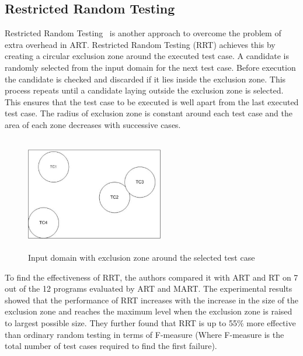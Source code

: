{\subsection{Restricted Random Testing}
Restricted Random Testing~\cite{chan2003normalized} is another approach to overcome the problem of extra overhead in ART. Restricted Random Testing (RRT) achieves this by creating a circular exclusion zone around the executed test case. A candidate is randomly selected from the input domain for the next test case. Before execution the candidate is checked and discarded if it lies inside the exclusion zone. This process repeats until a candidate laying outside the exclusion zone is selected. This ensures that the test case to be executed is well apart from the last executed test case. The radius of exclusion zone is constant around each test case and the area of each zone decreases with successive cases.

\begin{figure}[h]
	\centering
	\includegraphics[width= 6cm, height = 5cm]{Literature/RRT.pdf}
	\caption{Input domain with exclusion zone around the selected test case}
\end{figure}

To find the effectiveness of RRT, the authors compared it with ART and RT on 7 out of the 12 programs evaluated by ART and MART. The experimental results showed that the performance of RRT increases with the increase in the size of the exclusion zone and reaches the maximum level when the exclusion zone is raised to largest possible size. %
They further found that RRT is up to 55\% more effective than ordinary random testing in terms of F-measure (Where F-measure is the total number of test cases required to find the first failure).



}
